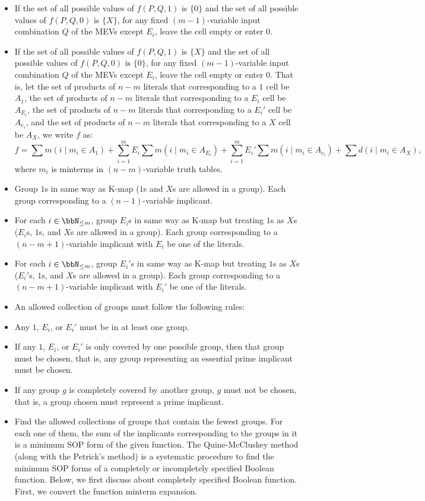 \documentclass[a4paper,12pt]{article}
\begin{document}
\begin{itemize}
\begin{itemize}
\begin{itemize}
\begin{itemize}
\begin{itemize}
\begin{itemize}
\begin{itemize}
\item If the set of all possible values of $f(P,Q,1)$ is $\{0\}$ and the set of all possible values of $f(P,Q,0)$ is $\{X\}$, for any fixed $(m-1)$-variable input combination $Q$ of the MEVs except $E_i$, leave the cell empty or enter $0$.
\item If the set of all possible values of $f(P,Q,1)$ is $\{X\}$ and the set of all possible values of $f(P,Q,0)$ is $\{0\}$, for any fixed $(m-1)$-variable input combination $Q$ of the MEVs except $E_i$, leave the cell empty or enter $0$.
\eit
That is, let the set of products of $n-m$ literals that corresponding to a $1$ cell be $A_1$, the set of products of $n-m$ literals that corresponding to a $E_i$ cell be $A_{E_i}$, the set of products of $n-m$ literals that corresponding to a $E_i'$ cell be $A_{e_i}$, and the set of products of $n-m$ literals that corresponding to a $X$ cell be $A_X$, we write $f$ as:
\[f=\sum m(i\mid m_i\in A_1)+\sum_{i=1}^mE_i\sum m(i\mid m_i\in A_{E_i})+\sum_{i=1}^mE_i'\sum m(i\mid m_i\in A_{e_i})+\sum d(i\mid m_i\in A_X),\]
where $m_i$ is minterms in $(n-m)$-variable truth tables.
\item Group $1$s in same way as K-map ($1$s and $X$s are allowed in a group). Each group corresponding to a $(n-1)$-variable implicant.
\item For each $i\in\bbN_{\leq m}$, group $E_i$s in same way as K-map but treating $1$s as $X$s ($E_i$s, $1$s, and $X$s are allowed in a group). Each group corresponding to a $(n-m+1)$-variable implicant with $E_i$ be one of the literals.
\item For each $i\in\bbN_{\leq m}$, group $E_i'$s in same way as K-map but treating $1$s as $X$s ($E_i'$s, $1$s, and $X$s are allowed in a group). Each group corresponding to a $(n-m+1)$-variable implicant with $E_i'$ be one of the literals.
\item An allowed collection of groups must follow the following rules:
\bit
\item Any $1$, $E_i$, or $E_i'$ must be in at least one group.
\item If any $1$, $E_i$, or $E_i'$ is only covered by one possible group, then that group must be chosen, that is, any group representing an essential prime implicant must be chosen.
\item If any group $g$ is completely covered by another group, $g$ must not be chosen, that is, a group chosen must represent a prime implicant.
\eit
\item Find the allowed collections of groups that contain the fewest groups. For each one of them, the sum of the implicants corresponding to the groups in it is a minimum SOP form of the given function.
\een
{}
The Quine-McCluskey method (along with the Petrick's method) is a systematic procedure to find the minimum SOP forms of a completely or incompletely specified Boolean function. Below, we first discuss about completely specified Boolean function.
First, we convert the function minterm expansion.


\end{itemize}
\end{itemize}
\end{itemize}
\end{itemize}
\end{itemize}
\end{itemize}
\end{itemize}
\end{document}
